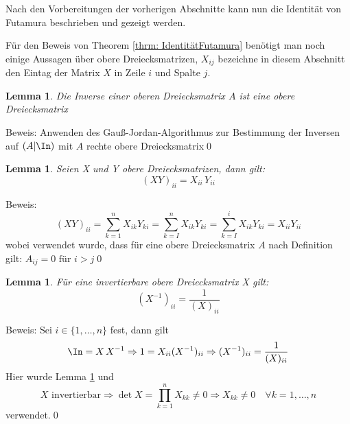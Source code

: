 \documentclass[a4paper,12pt]{report}
\newcommand{\inv}{^{-1}}
\newcommand{\1}{\mathds{1}}
\theoremstyle{plain} %
\newtheorem{lemma}[theorem]{Lemma}  %
\theoremstyle{definition} %
\theoremstyle{remark}
\begin{document}
            Nach den Vorbereitungen der vorherigen Abschnitte kann nun die Identität von Futamura beschrieben und gezeigt werden.

            Für den Beweis von Theorem \ref{thrm: IdentitätFutamura} benötigt man noch einige Aussagen über obere Dreiecksmatrizen,
            $X_{ij}$ bezeichne in diesem Abschnitt den Eintag der Matrix $X$ in Zeile $i$ und Spalte $j$.

            \begin{lemma}
                  \label{Hilfslemma_Futamura: Inv Dreieck}
                  Die Inverse einer oberen Dreiecksmatrix $A$ ist eine obere Dreiecksmatrix
            \end{lemma}
            Beweis: Anwenden des Gauß-Jordan-Algorithmus zur Bestimmung der Inversen auf $(A|\In)$ mit $A$ rechte obere Dreiecksmatrix\qed

            \begin{lemma}
                  \label{Hilfslemma_Futamura: Prod Dreieck}
                  Seien X und Y obere Dreiecksmatrizen, dann gilt:
                  $$(XY)_{ii} = X_{ii}\, Y_{ii}$$
            \end{lemma}
            Beweis:
            $$(XY)_{ii} = \sum_{k=1}^n X_{ik}Y_{ki} = \sum_{k=I}^{n}X_{ik}Y_{ki} = \sum_{k=I}^{i}X_{ik}Y_{ki} = X_{ii} Y_{ii}$$
            wobei verwendet wurde, dass für eine obere Dreiecksmatrix $A$ nach Definition gilt:
            $A_{ij} = 0 \text{ für }i>j$\qed

            \begin{lemma}
                  \label{Hilfslemma_Futamura: Diag Inv Dreieck}
                  Für eine invertierbare obere Dreiecksmatrix X gilt:
                  $$(X\inv)_{ii} = \frac 1 {(X)_{ii}}$$
            \end{lemma}
            Beweis: Sei $i\in\{1,\dots,n\}$ fest, dann gilt
            $$\In = X\,X\inv \Rightarrow 1 = X_{ii}(X\inv)_{ii} \Rightarrow (X\inv)_{ii} = \frac 1 {(X)_{ii}}$$
            Hier wurde Lemma \ref{Hilfslemma_Futamura: Prod Dreieck} und
            $$X \text{ invertierbar}\Rightarrow \det X = \prod_{k=1}^{n}X_{kk}\ne 0\Rightarrow X_{kk}\ne 0\quad \forall k=1,\dots,n$$
            verwendet.\qed\\
\end{document}
